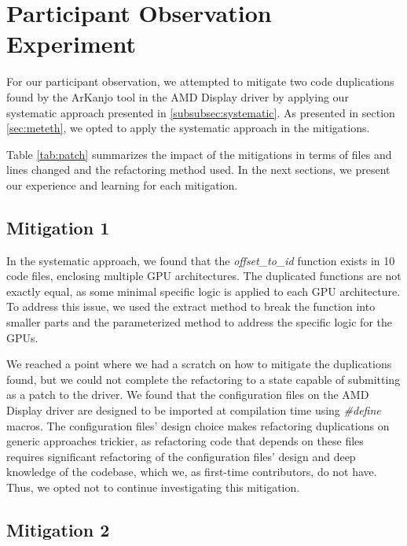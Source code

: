 \en

\section{Participant Observation Experiment}

For our participant observation, we attempted to mitigate two code 
duplications found by the ArKanjo tool in the AMD Display driver by applying 
our systematic approach presented in \ref{subsubsec:systematic}. 
As presented in section \ref{sec:meteth},
we opted to apply the systematic approach in the mitigations.

Table \ref{tab:patch} summarizes the impact of the mitigations in terms of 
files and lines changed and the refactoring method used. In the next sections, 
we present our experience and learning for each mitigation.



\subsection{Mitigation 1}

In the systematic approach, we found that the \textit{offset\_to\_id} function
exists in 10 code files, enclosing multiple GPU architectures. The duplicated
functions are not exactly equal, as some minimal specific logic is applied to 
each GPU architecture. To address this issue, we used the extract method to
break the function into smaller parts and the parameterized method to address
the specific logic for the GPUs.

We reached a point where we had a scratch on how to mitigate the duplications found, 
but we could not complete the refactoring to a state capable of submitting as a 
patch to the driver. We found that the configuration files on the AMD Display 
driver are designed to be imported at compilation time using \textit{\#define} macros. 
The configuration files' design choice makes refactoring duplications on generic 
approaches trickier, as refactoring code that depends on these files requires 
significant refactoring of the configuration files' design and deep knowledge 
of the codebase, which we, as first-time contributors, do not have. Thus, we opted 
not to continue investigating this mitigation.


\subsection{Mitigation 2}

